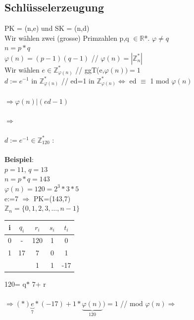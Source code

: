 \documentclass[10pt]{article}
\newcommand{\RN}{\mathbb{R}} %
\newcommand{\ZN}{\mathbb{Z}} %
\begin{document}
\subsection{Schlüsselerzeugung}
PK = (n,e) und SK = (n,d) \\
Wir wählen zwei (grosse) Primzahlen p,q $\in \RN$*. $\varphi\neq q$ \\
$n=p*q$ \\
$\varphi(n)=(p-1)(q-1)$ {\color{blue}// $\varphi(n) = |\ZN^*_n|$ }\\
{\color{blue}Wir wählen $e \in \ZN^*_{\varphi(n)}$} // ggT(e,$\varphi(n))=1$ \\
{\color{blue} $d:=e^{-1}$ in $\ZN^*_{\varphi(n)}$} // ed=1 in $\ZN^*_{\varphi(n)} \Leftrightarrow$ ed $\equiv$ 1 mod $\varphi(n)$\\ \\
$\Longrightarrow\varphi(n) | (ed-1)$\\ \\
$\Longrightarrow$ \fbox{$\exists k \in \ZN:e{\color{red}*d}+{\color{red}k*}\varphi(n))=1$} \\ \\
$d:=e^{-1}\in \ZN^*_{120}$ :  \\
\\
\textbf{Beispiel}: \\
$p=11$, $q=13$ \\
$n=p*q=143$ \\
$\varphi(n)=120=2^3*3*5$ \\
{\color{blue} e:=7} $\Rightarrow$ PK=(143,7) \\
$\ZN_n=\{0,1,2,3,\dots,n-1\}$ \\

\begin{tabular}{| c | c | c | c | c |}
	\hline
	i & $q_i$ & $r_i$ & $s_i$ & $t_i$ \\
	\hline
	0 & - & {\color{blue} 120} & {\color{red} 1} & {\color{red} 0} \\
	1 & {\color{red} 17} & {\color{blue} 7} & {\color{red} 0} & {\color{red} 1}\\
	\hline
	&&{\color{red} 1}&{\color{red} 1}&{\color{red} -17} \\
	\hline
\end{tabular} {\color{blue} 120=}{\color{red} q}$*${\color{blue} 7+}{\color{red} r} \\ \\
{\color{blue}$\Longrightarrow (*) \underbrace{e}_{7}*(-17)+1*\underbrace{\varphi(n)}_{120})=1$} {\color{red} // mod $\varphi(n) \Rightarrow$ }
\end{document}
